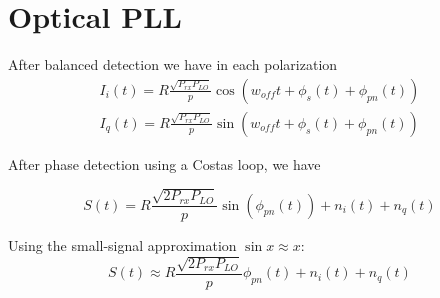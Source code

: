 \documentclass[a4paper]{article}
\begin{document}
%
%
%
%

\section{Optical PLL}

After balanced detection we have in each polarization
\begin{align}
I_i(t) = R\frac{\sqrt{P_{rx}P_{LO}}}{p}\cos(w_{off}t + \phi_s(t) + \phi_{pn}(t)) \\
I_q(t) =  R\frac{\sqrt{P_{rx}P_{LO}}}{p}\sin(w_{off}t + \phi_s(t) + \phi_{pn}(t))
\end{align}

After phase detection using a Costas loop, we have

\begin{equation}
S(t) = R\frac{\sqrt{2P_{rx}P_{LO}}}{p}\sin(\phi_{pn}(t)) + n_i(t) + n_q(t)
\end{equation}

Using the small-signal approximation $\sin x \approx x$:
\begin{equation}
S(t) \approx R\frac{\sqrt{2P_{rx}P_{LO}}}{p}\phi_{pn}(t) + n_i(t) + n_q(t)
\end{equation}
\end{document}
